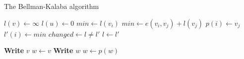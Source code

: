 \documentclass[11pt, a4paper]{article}
\begin{document}
\begin{algorithm}
\caption{The Bellman-Kalaba algorithm}
\label{alg:ex1} %


  \begin{algorithmic}[1]
            \State $l(v) \leftarrow \infty$
        \EndFor
        \State $l(u) \leftarrow 0$
        \Repeat
                \State $min \leftarrow l(v_i)$
                        \State $min \leftarrow e(v_i, v_j) + l(v_j)$
                        \State $p(i) \leftarrow v_j$
                    \EndIf
                \EndFor
                \State $l'(i) \leftarrow min$
            \EndFor
            \State $changed \leftarrow l \not= l'$
            \State $l \leftarrow l'$
    \EndProcedure
    
    \Statex
            \State \textbf{Write} $v$
        \Else
            \State $w \leftarrow v$
                \State \textbf{Write} $w$
                \State $w \leftarrow p(w)$
            \EndWhile
        \EndIf
    \EndProcedure
    \end{algorithmic}
\end{algorithm}
\end{document}
